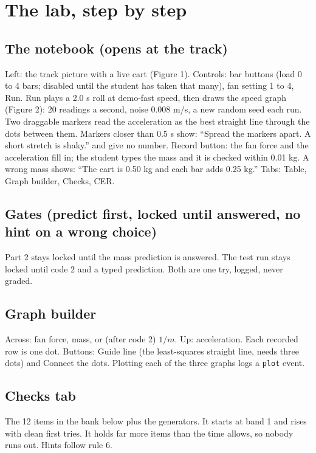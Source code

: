 \documentclass[10pt]{article}
\begin{document}
\section{The lab, step by step}
\subsection{The notebook (opens at the track)}
Left: the track picture with a live cart (Figure 1). Controls: bar buttons (load 0 to 4 bars; disabled until the student has taken that many), fan setting 1 to 4, Run. Run plays a 2.0 s roll at demo-fast speed, then draws the speed graph (Figure 2): 20 readings a second, noise 0.008 m/s, a new random seed each run. Two draggable markers read the acceleration as the best straight line through the dots between them. Markers closer than 0.5 s show: “Spread the markers apart. A short stretch is shaky.” and give no number. Record button: the fan force and the acceleration fill in; the student types the mass and it is checked within 0.01 kg. A wrong mass shows: “The cart is 0.50 kg and each bar adds 0.25 kg.” Tabs: Table, Graph builder, Checks, CER.

\subsection{Gates (predict first, locked until answered, no hint on a wrong choice)}
Part 2 stays locked until the mass prediction is answered. The test run stays locked until code 2 and a typed prediction. Both are one try, logged, never graded.

\subsection{Graph builder}
Across: fan force, mass, or (after code 2) $1/m$. Up: acceleration. Each recorded row is one dot. Buttons: Guide line (the least-squares straight line, needs three dots) and Connect the dots. Plotting each of the three graphs logs a \texttt{plot} event.

\subsection{Checks tab}
The 12 items in the bank below plus the generators. It starts at band 1 and rises with clean first tries. It holds far more items than the time allows, so nobody runs out. Hints follow rule 6.
\end{document}
